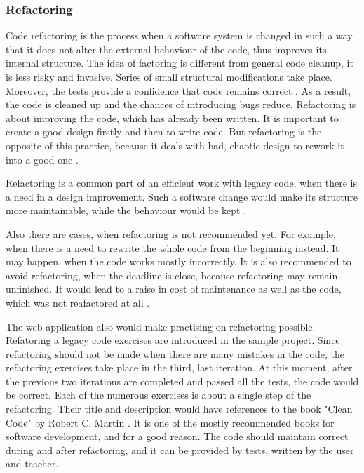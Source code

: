 \subsubsection{Refactoring}
Code refactoring is the process when a software system is changed in such a way that it does not alter the external behaviour of the code, thus improves its internal structure. The idea of factoring is different from general code cleanup, it is less risky and invasive. Series of small structural modifications take place. Moreover, the tests provide a confidence that code remains correct \cite{lc_effectively}. As a result, the code is cleaned up and the chances of introducing bugs reduce. Refactoring is about improving the code, which has already been written. It is important to create a good design firstly and then to write code. But refactoring is the opposite of this practice, because it deals with bad, chaotic design to rework it into a good one \cite[Preface]{ref_ec}.

Refactoring is a common part of an efficient work with legacy code, when there is a need in a design improvement. Such a software change would make its structure more maintainable, while the behaviour would be kept \cite{lc_effectively}.

Also there are cases, when refactoring is not recommended yet. For example, when there is a need to rewrite the whole code from the beginning instead. It may happen, when the code works mostly incorrectly. It is also recommended to avoid refactoring, when the deadline is close, because refactoring may remain unfinished. It would lead to a raise in cost of maintenance as well as the code, which was not reafactored at all \cite[Preface]{ref_debt}.

The web application also would make practising on refactoring possible. Refatoring a legacy code exercises are introduced in the sample project. Since refactoring should not be made when there are many mistakes in the code, the refactoring exercises take place in the third, last iteration. At this moment, after the previous two iterations are completed and passed all the tests, the code would be correct. Each of the numerous exercises is about a single step of the refactoring. Their title and description would have references to the book "Clean Code" by Robert C. Martin \cite{clean_code}. It is one of the mostly recommended books for software development, and for a good reason. The code should maintain correct during and after refactoring, and it can be provided by tests, written by the user and teacher.

